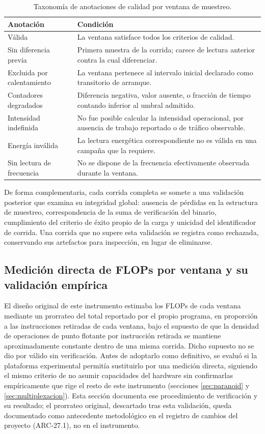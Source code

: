 \documentclass[12pt,oneside,spanish]{book}
\begin{document}
\begin{table}[H]
\centering
\caption{Taxonomía de anotaciones de calidad por ventana de muestreo.}
\label{tab:calidad}
\begin{tabular}{@{}p{4.3cm}p{10.2cm}@{}}
\toprule
\textbf{Anotación} & \textbf{Condición} \\
\midrule
Válida & La ventana satisface todos los criterios de calidad. \\
Sin diferencia previa & Primera muestra de la corrida; carece de lectura anterior contra la cual diferenciar. \\
Excluida por calentamiento & La ventana pertenece al intervalo inicial declarado como transitorio de arranque. \\
Contadores degradados & Diferencia negativa, valor ausente, o fracción de tiempo contando inferior al umbral admitido. \\
Intensidad indefinida & No fue posible calcular la intensidad operacional, por ausencia de trabajo reportado o de tráfico observable. \\
Energía inválida & La lectura energética correspondiente no es válida en una campaña que la requiere. \\
Sin lectura de frecuencia & No se dispone de la frecuencia efectivamente observada durante la ventana. \\
\bottomrule
\end{tabular}
\end{table}

De forma complementaria, cada corrida completa se somete a una validación posterior que examina su integridad global: ausencia de pérdidas en la estructura de muestreo, correspondencia de la suma de verificación del binario, cumplimiento del criterio de éxito propio de la carga y unicidad del identificador de corrida. Una corrida que no supere esta validación se registra como rechazada, conservando sus artefactos para inspección, en lugar de eliminarse.

\subsection{Medición directa de FLOPs por ventana y su validación empírica}
\label{sec:validacion-flops}

El diseño original de este instrumento estimaba los FLOPs de cada ventana mediante un prorrateo del total reportado por el propio programa, en proporción a las instrucciones retiradas de cada ventana, bajo el supuesto de que la densidad de operaciones de punto flotante por instrucción retirada se mantiene aproximadamente constante dentro de una misma corrida. Dicho supuesto no se dio por válido sin verificación. Antes de adoptarlo como definitivo, se evaluó si la plataforma experimental permitía sustituirlo por una medición directa, siguiendo el mismo criterio de no asumir capacidades del hardware sin confirmarlas empíricamente que rige el resto de este instrumento (secciones \ref{sec:paranoid} y \ref{sec:multiplexacion}). Esta sección documenta ese procedimiento de verificación y su resultado; el prorrateo original, descartado tras esta validación, queda documentado como antecedente metodológico en el registro de cambios del proyecto (ARC-27.1), no en el instrumento.
\end{document}
